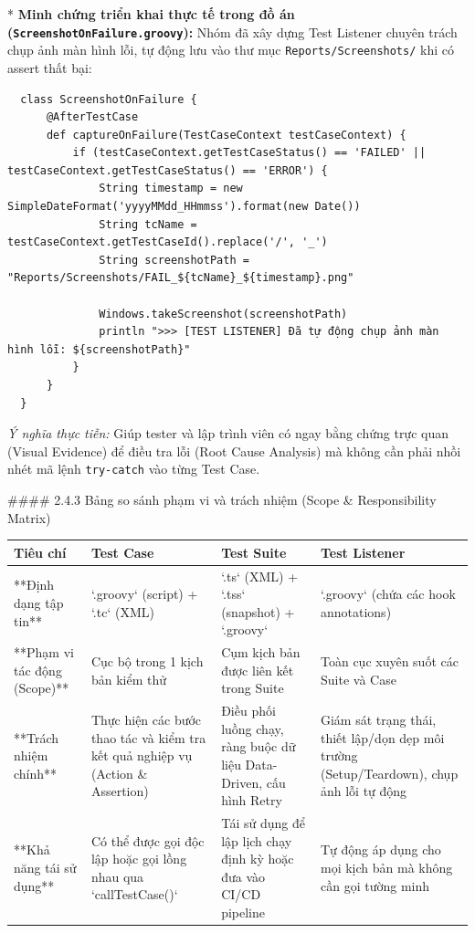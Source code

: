 {* \textbf{Minh chứng triển khai thực tế trong đồ án (\texttt{ScreenshotOnFailure.groovy}):}
  Nhóm đã xây dựng Test Listener chuyên trách chụp ảnh màn hình lỗi, tự động lưu vào thư mục \texttt{Reports/Screenshots/} khi có assert thất bại:
\begin{lstlisting}
  class ScreenshotOnFailure {
      @AfterTestCase
      def captureOnFailure(TestCaseContext testCaseContext) {
          if (testCaseContext.getTestCaseStatus() == 'FAILED' || testCaseContext.getTestCaseStatus() == 'ERROR') {
              String timestamp = new SimpleDateFormat('yyyyMMdd_HHmmss').format(new Date())
              String tcName = testCaseContext.getTestCaseId().replace('/', '_')
              String screenshotPath = "Reports/Screenshots/FAIL_${tcName}_${timestamp}.png"
              
              Windows.takeScreenshot(screenshotPath)
              println ">>> [TEST LISTENER] Đã tự động chụp ảnh màn hình lỗi: ${screenshotPath}"
          }
      }
  }
\end{lstlisting}

  \textit{Ý nghĩa thực tiễn:} Giúp tester và lập trình viên có ngay bằng chứng trực quan (Visual Evidence) để điều tra lỗi (Root Cause Analysis) mà không cần phải nhồi nhét mã lệnh \texttt{try-catch} vào từng Test Case.

#### 2.4.3 Bảng so sánh phạm vi và trách nhiệm (Scope & Responsibility Matrix)

\begin{table}[H]
\centering
\begin{tabular}{|l|l|l|l|}
\hline
\textbf{Tiêu chí} & \textbf{Test Case} & \textbf{Test Suite} & \textbf{Test Listener} \\ \hline
**Định dạng tập tin** & `.groovy` (script) + `.tc` (XML) & `.ts` (XML) + `.tss` (snapshot) + `.groovy` & `.groovy` (chứa các hook annotations) \\ \hline
**Phạm vi tác động (Scope)** & Cục bộ trong 1 kịch bản kiểm thử & Cụm kịch bản được liên kết trong Suite & Toàn cục xuyên suốt các Suite và Case \\ \hline
**Trách nhiệm chính** & Thực hiện các bước thao tác và kiểm tra kết quả nghiệp vụ (Action \& Assertion) & Điều phối luồng chạy, ràng buộc dữ liệu Data-Driven, cấu hình Retry & Giám sát trạng thái, thiết lập/dọn dẹp môi trường (Setup/Teardown), chụp ảnh lỗi tự động \\ \hline
**Khả năng tái sử dụng** & Có thể được gọi độc lập hoặc gọi lồng nhau qua `callTestCase()` & Tái sử dụng để lập lịch chạy định kỳ hoặc đưa vào CI/CD pipeline & Tự động áp dụng cho mọi kịch bản mà không cần gọi tường minh \\ \hline
\end{tabular}
\end{table}





}

